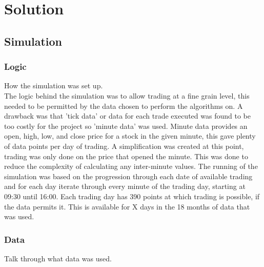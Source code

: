 \documentclass[12pt,a4paper]{article}
\begin{document}
\section{Solution}

\iffalse
This section presents the solutions to the problems in detail.  The design and implementation details should all be placed in this section.  You may create a number of subsections, each focussing on one issue.
This section should be between 4 to 7 pages in length.
\fi

\iffalse
#################################################################################
\fi

\subsection*{Simulation}

\subsubsection*{Logic}

How the simulation was set up.\\

The logic behind the simulation was to allow trading at a fine grain level, this needed to be permitted by the data chosen to perform the algorithms on. A drawback was that 'tick data' or data for each trade executed was found to be too costly for the project so 'minute data' was used. Minute data provides an open, high, low, and close price for a stock in the given minute, this gave plenty of data points per day of trading. A simplification was created at this point, trading was only done on the price that opened the minute. This was done to reduce the complexity of calculating any inter-minute values. The running of the simulation was based on the progression through each date of available trading and for each day iterate through every minute of the trading day, starting at 09:30 until 16:00. Each trading day has 390 points at which trading is possible, if the data permits it. This is available for X days in the 18 months of data that was used. \\

\subsubsection*{Data}

Talk through what data was used.\\
\end{document}
